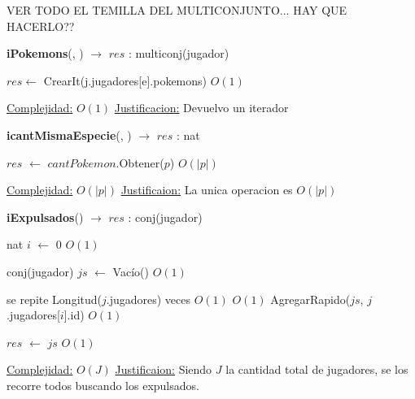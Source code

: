 \begin{Algoritmos}
\begin{algorithm}[H]
\begin{algorithmic}[1]
\end{algorithmic}
\end{algorithm}



VER TODO EL TEMILLA DEL MULTICONJUNTO... HAY QUE HACERLO?? 

\begin{algorithm}[H]
{\textbf{iPokemons}(, ) $\to$ $res$ : multiconj(jugador)}
\begin{algorithmic}[1]

\State $res \gets $ CrearIt(j.jugadores[e].pokemons) \Comment $O(1)$

\medskip
\State \underline{Complejidad:} $O(1)$
\State \underline{Justificacion:} Devuelvo un iterador

\end{algorithmic}
\end{algorithm}



\begin{algorithm}[H]
{\textbf{icantMismaEspecie}(, ) $\to$ $res$ : nat}
\begin{algorithmic}[1]

\State $res$ $\gets$ $cantPokemon$.Obtener($p$)  \Comment $O(|p|)$

\medskip
\Statex \underline{Complejidad:} $O(|p|)$
\Statex \underline{Justificaion:} La unica operacion es $O(|p|)$

\end{algorithmic}
\end{algorithm}  



\begin{algorithm}[H]
{\textbf{iExpulsados}() $\to$ $res$ : conj(jugador)}
\begin{algorithmic}[1]

\State nat $i$ $\gets$ 0 \Comment $O(1)$

\State conj(jugador) $js$ $\gets$ Vac\'io() \Comment $O(1)$

 \Comment se repite Longitud($j$.jugadores) veces $O(1)$
	 \Comment $O(1)$
		\State AgregarRapido($js$, $j$.jugadores[$i$].id) \Comment $O(1)$
	\EndIf
\EndWhile

\State $res$ $\gets$ $js$ \Comment $O(1)$

\medskip
\Statex \underline{Complejidad:} $O(J)$
\Statex \underline{Justificaion:} Siendo $J$ la cantidad total de jugadores, se los recorre todos buscando los expulsados.

\end{algorithmic}
\end{algorithm}  
  
\end{Algoritmos}